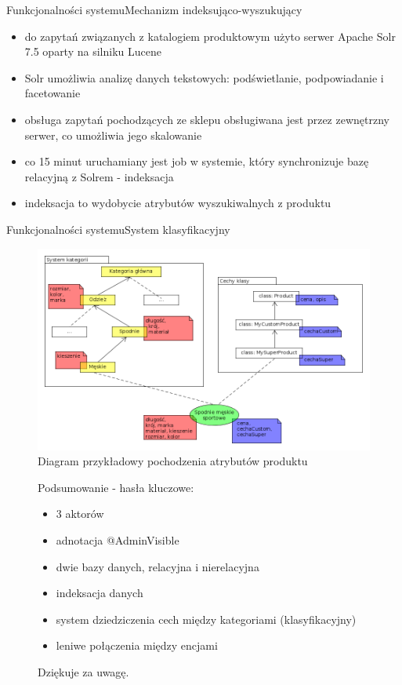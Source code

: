 \documentclass[polish,xcolor=table,9pt,aspectratio=1610,hyperref={pdfpagemode=FullScreen}]{beamer}
\begin{document}
\begin{frame}{Funkcjonalności systemu}{Mechanizm indeksująco-wyszukujący}
\begin{itemize}
	\item<1-> do zapytań związanych z katalogiem produktowym użyto serwer Apache Solr 7.5 oparty na silniku Lucene
	\item<1-> Solr umożliwia analizę danych tekstowych: podświetlanie, podpowiadanie i facetowanie 
	\item<1-> obsługa zapytań pochodzących ze sklepu obsługiwana jest przez zewnętrzny serwer, co umożliwia jego skalowanie
	\item<1-> co 15 minut uruchamiany jest job w systemie, który synchronizuje bazę relacyjną z Solrem - indeksacja
	\item<1-> indeksacja to wydobycie atrybutów wyszukiwalnych z produktu
\end{itemize}
\end{frame}


\begin{frame}{Funkcjonalności systemu}{System klasyfikacyjny}
	\begin{figure}
		\begin{center}
			\includegraphics[scale=0.3]{cechyProd.png}
		\end{center}
		\caption{{\color{black}Diagram przykładowy pochodzenia atrybutów produktu}} \label{cechyProd}
	\end{figure}
\end{frame}

\begin{frame}
\begin{figure}
	Podsumowanie - hasła kluczowe:
	
	\begin{itemize}
		\item<1-> 3 aktorów
		\item<1-> adnotacja @AdminVisible
		\item<1-> dwie bazy danych, relacyjna i nierelacyjna
		\item<1-> indeksacja danych
		\item<1-> system dziedziczenia cech między kategoriami (klasyfikacyjny)
		\item<1-> leniwe połączenia między encjami
	\end{itemize}
	
	Dziękuje za uwagę.
\end{figure}
\end{frame}
\end{document}
